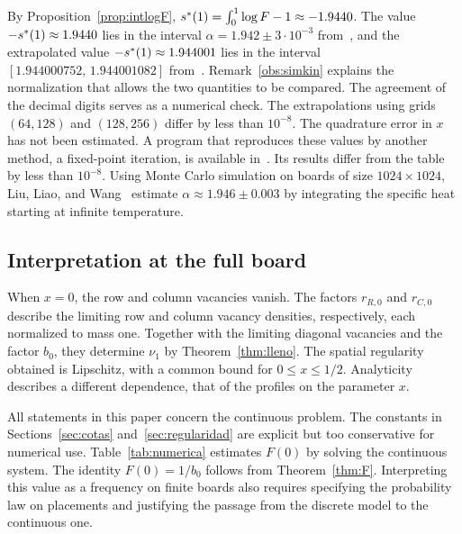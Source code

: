 By Proposition~\ref{prop:intlogF}, $s^{*}(1)=\int_0^1\log F-1\approx-1.9440$. The value $-s^{*}(1)\approx1.9440$ lies in the interval
$\alpha=1.942\pm3\cdot10^{-3}$ from~\cite{Simkin}, and the extrapolated value $-s^{*}(1)\approx1.944001$ lies in the interval
$[1.944000752,\,1.944001082]$ from~\cite{NAB}. Remark~\ref{obs:simkin} explains the normalization that allows the two quantities to be
compared. The agreement of the decimal digits serves as a numerical check. The extrapolations using grids $(64,128)$ and $(128,256)$
differ by less than $10^{-8}$. The quadrature error in $x$ has not been estimated. \ifx\DOIcodigo\empty\else A program that reproduces
these values by another method, a fixed-point iteration, is available in~\cite{Codigo}. Its results differ from the table by less than
$10^{-8}$. \fi Using Monte Carlo simulation on boards of size $1024\times1024$, Liu, Liao, and Wang~\cite{LLW} estimate
$\alpha\approx1.946\pm0.003$ by integrating the specific heat starting at infinite temperature.

\subsection{Interpretation at the full board}

When $x=0$, the row and column vacancies vanish. The factors $r_{R,0}$ and $r_{C,0}$ describe the limiting row and column vacancy
densities, respectively, each normalized to mass one. Together with the limiting diagonal vacancies and the factor $b_0$, they
determine $\nu_1$ by Theorem~\ref{thm:lleno}. The spatial regularity obtained is Lipschitz, with a common bound for $0\le x\le 1/2$.
Analyticity describes a different dependence, that of the profiles on the parameter $x$.

All statements in this paper concern the continuous problem. The constants in Sections~\ref{sec:cotas} and~\ref{sec:regularidad} are
explicit but too conservative for numerical use. Table~\ref{tab:numerica} estimates $F(0)$ by solving the continuous system. The
identity $F(0)=1/b_0$ follows from Theorem~\ref{thm:F}. Interpreting this value as a frequency on finite boards also requires
specifying the probability law on placements and justifying the passage from the discrete model to the continuous one.
